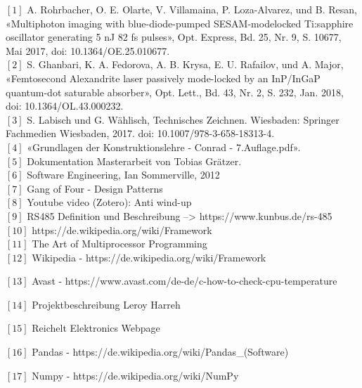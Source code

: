 $[1]$	A. Rohrbacher, O. E. Olarte, V. Villamaina, P. Loza-Alvarez, und B. Resan, «Multiphoton imaging with blue-diode-pumped SESAM-modelocked Ti:sapphire oscillator generating 5 nJ 82 fs pulses», Opt. Express, Bd. 25, Nr. 9, S. 10677, Mai 2017, doi: 10.1364/OE.25.010677.\\

$[2]$	S. Ghanbari, K. A. Fedorova, A. B. Krysa, E. U. Rafailov, und A. Major, «Femtosecond Alexandrite laser passively mode-locked by an InP/InGaP quantum-dot saturable absorber», Opt. Lett., Bd. 43, Nr. 2, S. 232, Jan. 2018, doi: 10.1364/OL.43.000232.\\

$[3]$    S. Labisch und G. Wählisch, Technisches Zeichnen. Wiesbaden: Springer Fachmedien Wiesbaden, 2017. doi: 10.1007/978-3-658-18313-4.\\

$[4]$   «Grundlagen der Konstruktionslehre - Conrad - 7.Auflage.pdf».\\

$[5]$    Dokumentation Masterarbeit von Tobias Grätzer.\\

$[6]$   Software Engineering, Ian Sommerville, 2012\\

$[7]$   Gang of Four - Design Patterns\\

$[8]$   Youtube video (Zotero): Anti wind-up\\

$[9]$   RS485 Definition und Beschreibung --> https://www.kunbus.de/rs-485\\

$[10]$  https://de.wikipedia.org/wiki/Framework\\

$[11]$  The Art of Multiprocessor Programming\\

$[12]$  Wikipedia - https://de.wikipedia.org/wiki/Framework

$[13]$  Avast - https://www.avast.com/de-de/c-how-to-check-cpu-temperature

$[14]$  Projektbeschreibung Leroy Harreh

$[15]$  Reichelt Elektronics Webpage

$[16]$ Pandas - https://de.wikipedia.org/wiki/Pandas_(Software)

$[17]$ Numpy - https://de.wikipedia.org/wiki/NumPy